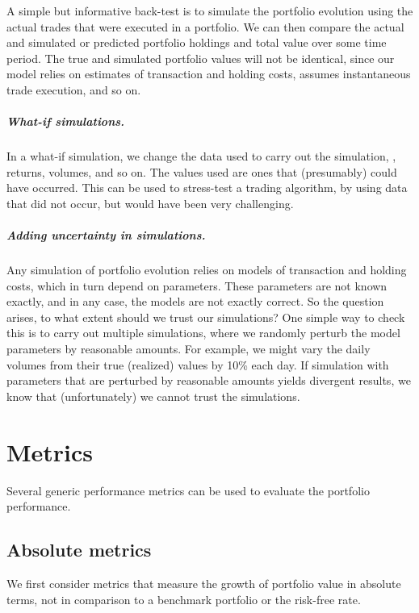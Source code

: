 \documentclass[openany]{article}  %
\begin{document}
A simple but informative back-test is to simulate the portfolio
evolution using the actual trades that were executed in a portfolio.
We can then compare the actual and simulated or predicted
portfolio holdings and total value over some time period.
The true and simulated portfolio values
will not be identical, since our model relies on
estimates of transaction and holding costs,
assumes instantaneous trade execution, and so on.

\paragraph{What-if simulations.}
In a what-if simulation, we change the data used to carry out the
simulation, \ie, returns, volumes, and so on.
The values used are ones that (presumably) could have occurred.
This can be used to stress-test a trading algorithm, by using data
that did not occur, but would have been very challenging.

\paragraph{Adding uncertainty in simulations.}
Any simulation of portfolio evolution relies on models of
transaction and holding costs, which in turn depend on parameters.
These parameters are not known exactly, and in any case,
the models are not exactly correct.
So the question arises, to what extent should we trust our simulations?
One simple way to check this is to carry out multiple simulations,
where we randomly perturb the model parameters by reasonable
amounts.  For example, we might vary the daily volumes
from their true (realized) values by 10\% each day.  If
simulation with parameters that are perturbed by reasonable amounts
yields divergent results, we know that (unfortunately) we cannot
trust the simulations.


\chapter{Metrics}
\label{s-metrics}
Several generic performance metrics can be used to evaluate the
portfolio performance.

\section{Absolute metrics}
We first consider metrics that measure the growth of portfolio value in absolute terms,
not in comparison to a benchmark portfolio or the risk-free rate.
\end{document}
